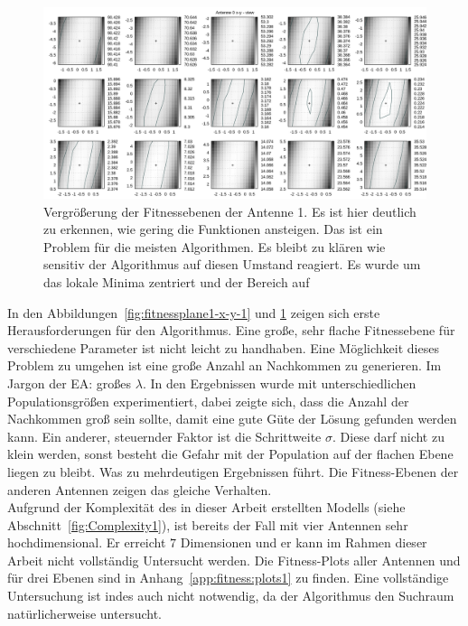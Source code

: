 \begin{figure}[ht!]
  \caption[Fitness Ebenen Heatmap, vergrößert]{Vergrößerung der Fitnessebenen der Antenne 1. Es ist hier deutlich zu erkennen, wie gering die Funktionen ansteigen. Das ist ein Problem für die meisten Algorithmen. Es bleibt zu klären wie sensitiv der Algorithmus auf diesen Umstand reagiert. Es wurde um das lokale Minima zentriert und der Bereich auf} %
  \begin{center}
   \includegraphics[width=\textwidth]{img/fitness/xy_a0zoomed.png}
  \end{center}
  \label{fig:fitnessplane1-x-y-zoom-1}
%
\end{figure}
%
In den Abbildungen~\ref{fig:fitnessplane1-x-y-1} und \ref{fig:fitnessplane1-x-y-zoom-1} zeigen sich erste Herausforderungen für den Algorithmus. Eine große, sehr flache Fitnessebene für verschiedene Parameter ist nicht leicht zu handhaben. Eine Möglichkeit dieses Problem zu umgehen ist eine große Anzahl an Nachkommen zu generieren. Im Jargon der EA: großes $\lambda$. In den Ergebnissen wurde mit unterschiedlichen Populationsgrößen experimentiert, dabei zeigte sich, dass die Anzahl der Nachkommen groß sein sollte, damit eine gute Güte der Lösung gefunden werden kann. Ein anderer, steuernder Faktor ist die Schrittweite $\sigma$. Diese darf nicht zu klein werden, sonst besteht die Gefahr mit der Population auf der flachen Ebene liegen zu bleibt. Was zu mehrdeutigen Ergebnissen führt. Die Fitness-Ebenen der anderen Antennen zeigen das gleiche Verhalten.\\
Aufgrund der Komplexität des in dieser Arbeit erstellten Modells (siehe Abschnitt~\ref{fig:Complexity1}), ist bereits der Fall mit vier Antennen sehr hochdimensional. Er erreicht $7$ Dimensionen und er kann im Rahmen dieser Arbeit nicht vollständig Untersucht werden. Die Fitness-Plots aller Antennen und für drei Ebenen sind in Anhang~\ref{app:fitness:plots1} zu finden. Eine vollständige Untersuchung ist indes auch nicht notwendig, da der Algorithmus den Suchraum natürlicherweise untersucht. 
